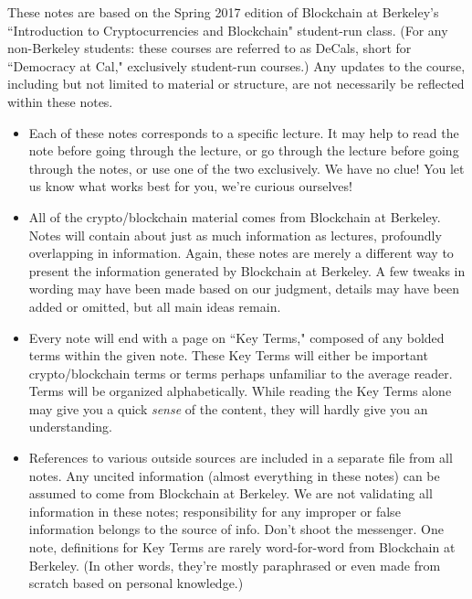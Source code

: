 \documentclass[full.tex]{subfiles}
\begin{document}
    These notes are based on the Spring 2017 edition of Blockchain at Berkeley's ``Introduction to Cryptocurrencies and Blockchain" student-run class. (For any non-Berkeley students: these courses are referred to as DeCals, short for ``Democracy at Cal," exclusively student-run courses.) Any updates to the course, including but not limited to material or structure, are not necessarily be reflected within these notes.
    \begin{itemize}
        \item Each of these notes corresponds to a specific lecture. It may help to read the note before going through the lecture, or go through the lecture before going through the notes, or use one of the two exclusively. We have no clue! You let us know what works best for you, we're curious ourselves!
        \item All of the crypto/blockchain material comes from Blockchain at Berkeley. Notes will contain about just as much information as lectures, profoundly overlapping in information. Again, these notes are merely a different way to present the information generated by Blockchain at Berkeley. A few tweaks in wording may have been made based on our judgment, details may have been added or omitted, but all main ideas remain.
        \item Every note will end with a page on ``Key Terms," composed of any bolded terms within the given note. These Key Terms will either be important crypto/blockchain terms or terms perhaps unfamiliar to the average reader. Terms will be organized alphabetically. While reading the Key Terms alone may give you a quick \textit{sense} of the content, they will hardly give you an understanding.
        \item References to various outside sources are included in a separate file from all notes. Any uncited information (almost everything in these notes) can be assumed to come from Blockchain at Berkeley. We are not validating all information in these notes; responsibility for any improper or false information belongs to the source of info. Don't shoot the messenger. One note, definitions for Key Terms are rarely word-for-word from Blockchain at Berkeley. (In other words, they're mostly paraphrased or even made from scratch based on personal knowledge.)
    \end{itemize}
    
    \newpage
    \thispagestyle{firstpage}
    \vspace*{2\baselineskip}
\end{document}
